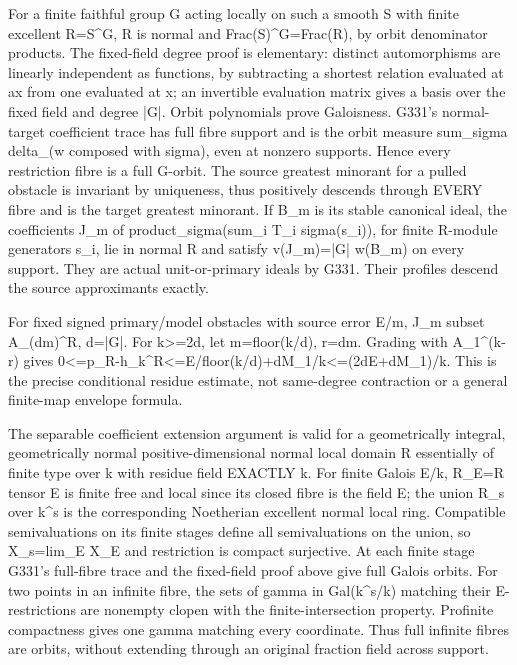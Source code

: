 \documentclass[11pt]{article}
\begin{document}
For a finite faithful group G acting locally on such a smooth S with finite excellent R=S\textasciicircum{}G, R is normal and Frac(S)\textasciicircum{}G=Frac(R), by orbit denominator products. The fixed-field degree proof is elementary: distinct automorphisms are linearly independent as functions, by subtracting a shortest relation evaluated at ax from one evaluated at x; an invertible evaluation matrix gives a basis over the fixed field and degree |G|. Orbit polynomials prove Galoisness. G331's normal-target coefficient trace has full fibre support and is the orbit measure sum\_sigma delta\_(w composed with sigma), even at nonzero supports. Hence every restriction fibre is a full G-orbit. The source greatest minorant for a pulled obstacle is invariant by uniqueness, thus positively descends through EVERY fibre and is the target greatest minorant. If B\_m is its stable canonical ideal, the coefficients J\_m of product\_sigma(sum\_i T\_i sigma(s\_i)), for finite R-module generators s\_i, lie in normal R and satisfy v(J\_m)=|G| w(B\_m) on every support. They are actual unit-or-primary ideals by G331. Their profiles descend the source approximants exactly.

For fixed signed primary/model obstacles with source error E/m, J\_m subset A\_(dm)\textasciicircum{}R, d=|G|. For k>=2d, let m=floor(k/d), r=dm. Grading with A\_1\textasciicircum{}(k-r) gives 0<=p\_R-h\_k\textasciicircum{}R<=E/floor(k/d)+dM\_1/k<=(2dE+dM\_1)/k. This is the precise conditional residue estimate, not same-degree contraction or a general finite-map envelope formula.

The separable coefficient extension argument is valid for a geometrically integral, geometrically normal positive-dimensional normal local domain R essentially of finite type over k with residue field EXACTLY k. For finite Galois E/k, R\_E=R tensor E is finite free and local since its closed fibre is the field E; the union R\_s over k\textasciicircum{}s is the corresponding Noetherian excellent normal local ring. Compatible semivaluations on its finite stages define all semivaluations on the union, so X\_s=lim\_E X\_E and restriction is compact surjective. At each finite stage G331's full-fibre trace and the fixed-field proof above give full Galois orbits. For two points in an infinite fibre, the sets of gamma in Gal(k\textasciicircum{}s/k) matching their E-restrictions are nonempty clopen with the finite-intersection property. Profinite compactness gives one gamma matching every coordinate. Thus full infinite fibres are orbits, without extending through an original fraction field across support.
\end{document}
